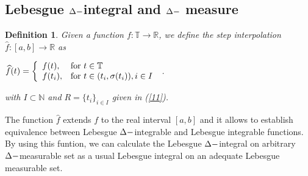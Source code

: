 \documentclass[12pt,a4paper,oneside,titlepage]{article}
\newtheorem{Def}{Definition}
\begin{document}
\begin{itemize}
\begin{center}

\end{center}
\end{itemize}

\bigskip



















\newpage

\subsection{Lebesgue $\Delta \-- $integral and $\Delta \-- $ measure} 


\begin{Def}
\label{rozszerzenie}
Given a function $f: \mathbb{T} \rightarrow \mathbb{R}$, we define the step interpolation $\widehat{f}: [a,b] \rightarrow \mathbb{R} $ as
\begin{center}
$
\widehat{f} (t)  = \left\{ \begin{array}{ll}
f(t), & \textrm{for $t \in \mathbb{T}$}\\
f(t_i), & \textrm{for $ t \in (t_i, \sigma(t_i)), i \in I$}\\
\end{array} \right.
$ .
\end{center}
with $I \subset \mathbb{N}$ and $R= \lbrace t_i \rbrace_{i \in I}$ given in (\ref{11}). 
\end{Def}

The function $\widehat{f}$ extends $f $ to the real interval $[a,b]$ and it allows to establish equivalence between Lebesgue $\Delta \-- $integrable and Lebesgue integrable functions. By using this funtion, we can calculate the Lebesgue $\Delta \-- $integral on arbitrary $\Delta \-- $measurable set as a usual Lebesgue integral on an adequate Lebesgue measurable set. 
\end{document}

